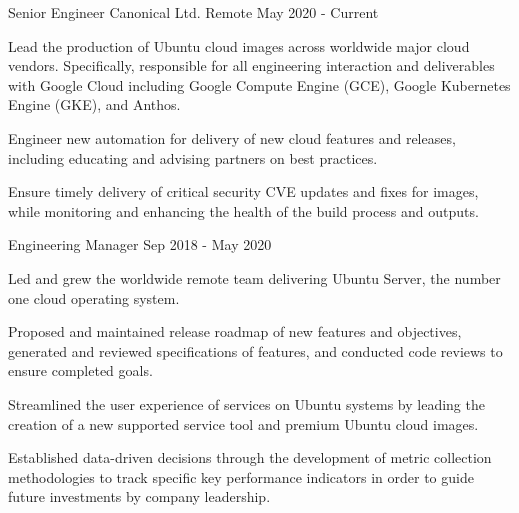 

\begin{cventries}

  \cventry
    {Senior Engineer}
    {Canonical Ltd.}
    {Remote}
    {May 2020 - Current}
    {
      \begin{cvitems}
        \item {
          Lead the production of Ubuntu cloud images across worldwide major
          cloud vendors. Specifically, responsible for all engineering
          interaction and deliverables with Google Cloud including Google
          Compute Engine (GCE), Google Kubernetes Engine (GKE), and Anthos.
        }
        \item {
          Engineer new automation for delivery of new cloud features and
          releases, including educating and advising partners on best
          practices.
        }
        \item {
          Ensure timely delivery of critical security CVE updates and fixes
          for images, while monitoring and enhancing the health of the build
          process and outputs.
        }
      \end{cvitems}
    }
    {}

  \cventry
    {Engineering Manager}
    {}
    {}
    {Sep 2018 - May 2020}
    {
      \begin{cvitems}
        \item {
          Led and grew the worldwide remote team delivering Ubuntu Server,
          the number one cloud operating system.
        }
        \item {
          Proposed and maintained release roadmap of new features and
          objectives, generated and reviewed specifications of features, and
          conducted code reviews to ensure completed goals.
        }
        \item {
          Streamlined the user experience of services on Ubuntu systems by
          leading the creation of a new supported service tool and premium
          Ubuntu cloud images.
        }
        \item {
          Established data-driven decisions through the development of metric
          collection methodologies to track specific key performance
          indicators in order to guide future investments by company
          leadership.
        }
      \end{cvitems}
    }
    {}


\end{cventries}

